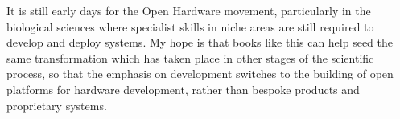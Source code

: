 \documentclass[
]{book}
\begin{document}
It is still early days for the Open Hardware movement, particularly in the biological sciences where specialist skills in niche areas are still required to develop and deploy systems. My hope is that books like this can help seed the same transformation which has taken place in other stages of the scientific process, so that the emphasis on development switches to the building of open platforms for hardware development, rather than bespoke products and proprietary systems.


\end{document}
